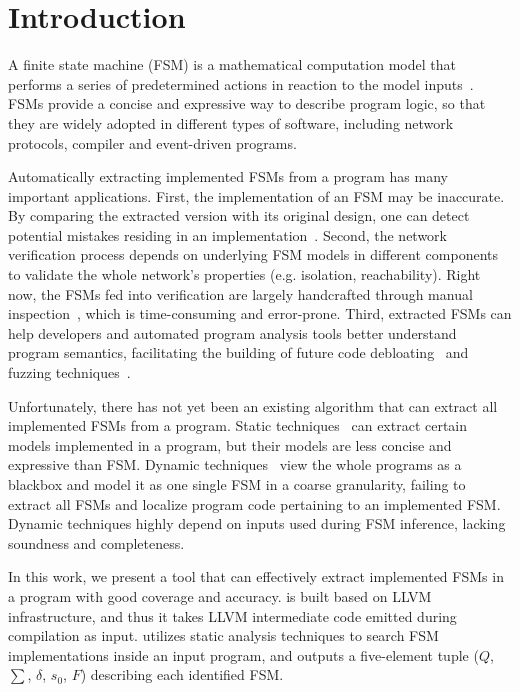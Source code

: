 \section{Introduction}
\label{sec:intro}

A finite state machine (FSM) is a mathematical computation model 
that performs a series of predetermined actions in 
reaction to the model inputs~\cite{fsm}. 
FSMs provide a concise and expressive way to describe
program logic, so that they are widely adopted in different types of software, 
including network protocols, 
compiler and event-driven programs. 

Automatically extracting implemented FSMs from a program has 
many important applications. 
First, the implementation of an FSM may be inaccurate. By 
comparing the extracted version with its original design, one 
can detect potential mistakes residing in an implementation~\cite{protocol-bug}. 
Second, the network verification process depends on underlying FSM models 
in different components to validate the whole network's properties 
(e.g. isolation, reachability).
Right now, the FSMs fed into verification are largely handcrafted through 
manual inspection~\cite{fayaz2016buzz,SymNet}, 
which is time-consuming and error-prone. 
Third, extracted FSMs can help developers and automated program analysis tools
better understand program semantics, facilitating the building of future 
code debloating~\cite{container-debloating-1,container-debloating-2,dinghao-1} 
and fuzzing techniques~\cite{afl,Angora,youwei-1}.



Unfortunately, there has not yet been an existing algorithm that can extract 
all implemented FSMs from a program.
Static techniques~\cite{wu2016automatic,khalid2016paving} 
can extract certain models implemented in a program,
but their models are less concise and expressive than FSM. 
Dynamic techniques~\cite{angluin1987learning,moon2019alembic,cho2011mace} 
view the whole programs as a blackbox and 
model it as one single FSM in a coarse granularity, 
failing to extract all FSMs and localize program code 
pertaining to an implemented FSM. 
Dynamic techniques highly depend on inputs used during FSM inference, 
lacking soundness and completeness.  

In this work, we present a tool \Tool{} that can effectively extract implemented FSMs 
in a program
with good coverage and accuracy. 
\Tool{} is built based on LLVM infrastructure, 
and thus it takes LLVM intermediate 
code emitted during compilation as input. 
\Tool{} utilizes static analysis techniques to search FSM implementations inside 
an input program,
and outputs a five-element tuple ($Q$, $\sum$, $\delta$, $s_0$, $F$) 
describing each identified FSM. 


